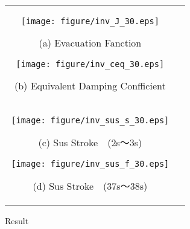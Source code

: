 \documentclass[a4paper,12pt]{article_vdlab_sotsuron}
\begin{document}
  \begin{figure}[h!]
      \begin{tabular}{cc}
        \begin{minipage}{0.5\hsize}
          \centering
          \texttt{[image: figure/inv\_J\_30.eps]}
          \begin{center}
            \vspace{-4mm}
            \ (a) Evacuation Fanction\
          \end{center}
        \end{minipage}
        \begin{minipage}{0.5\hsize}
          \centering
          \texttt{[image: figure/inv\_ceq\_30.eps]}
          \begin{center}
            \vspace{-4mm}
            \ (b)  Equivalent Damping Confficient\
          \end{center}
        \end{minipage}\\
          \begin{minipage}{0.5\hsize}
            \centering
            \texttt{[image: figure/inv\_sus\_s\_30.eps]}
            \begin{center}
              \vspace{-4mm}
              \ (c) Sus Stroke　(2s～3s)\
            \end{center}
          \end{minipage}
          \begin{minipage}{0.5\hsize}
            \centering
            \texttt{[image: figure/inv\_sus\_f\_30.eps]}
            \begin{center}
              \vspace{-4mm}
              \ (d) Sus Stroke　(37s～38s)\
            \end{center}
          \end{minipage}
        \end{tabular}
        \vspace{-1mm}
      \caption{Result}
      \label{fig:sim_GD_test_inv_30}
  \end{figure}
\end{document}
